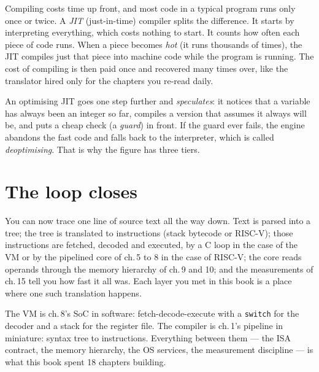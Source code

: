 Compiling costs time up front, and most code in a typical program
runs only once or twice. A \emph{JIT} (just-in-time) compiler splits the
difference. It starts by interpreting everything, which costs nothing to
start. It counts how often each piece of code runs. When a piece
becomes \emph{hot} (it runs thousands of times), the JIT compiles just that
piece into machine code while the program is running. The cost of compiling is
then paid once and recovered many times over, like the translator hired only for
the chapters you re-read daily.

An optimising JIT goes one step further and \emph{speculates}: it
notices that a variable has always been an integer so far, compiles a
version that assumes it always will be, and puts a cheap check (a \emph{guard})
in front. If the guard ever fails, the engine abandons the fast code and
falls back to the interpreter, which is called \emph{deoptimising}. That is
why the figure has three tiers.


\section{The loop closes}

You can now trace one line of source text all the way down. Text is parsed into
a tree; the tree is translated to instructions (stack bytecode or RISC-V);
those instructions are fetched, decoded and executed, by a C loop
in the case of the VM or by the pipelined core of ch.\,5 to 8 in the case of
RISC-V; the core reads operands through the memory hierarchy of ch.\,9 and 10;
and the measurements of ch.\,15 tell you how fast it all was. Each layer you
met in this book is a place where one such translation happens.


The VM is ch.\,8's SoC in software: fetch-decode-execute with a
\texttt{switch} for the decoder and a stack for the register file.
The compiler is ch.\,1's pipeline in miniature: syntax tree to instructions.
Everything between them --- the ISA contract, the memory
hierarchy, the OS services, the measurement discipline --- is what
this book spent 18 chapters building.

